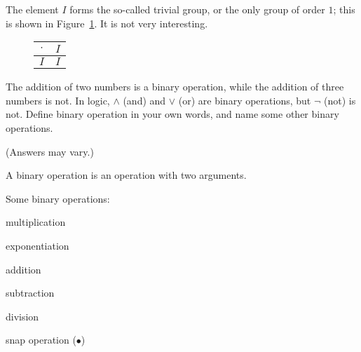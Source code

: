 \documentclass[../key.tex]{subfiles}
\begin{document}
\noindent The element $I$ forms the so-called trivial group, or the only group of order $1$; this is shown in Figure~\ref{fig:trivial_group}. It is not very interesting.

\begin{figure}[h]
	\begin{center}
		\begin{minipage}[b]{\textwidth}
			\centering
			\begin{tabular}{c|c}
				\hline
				$\cdot$ & $I$ \\ \hline
				\rowcolor{light-gray}
				$I$ & $I$ \\ \hline
			\end{tabular}
			\vspace*{0.5\baselineskip}
		\end{minipage}
	\end{center}
	\vspace*{-2\baselineskip}
	\begin{center}
		\begin{minipage}[t]{\textwidth}
			\label{fig:trivial_group}
		\end{minipage}
	\end{center}
	\vspace*{-2\baselineskip}
\end{figure}

\begin{outer_problem}
\item The addition of two numbers is a binary operation, while the addition of three numbers is not. In logic, $\land$ (and) and $\lor$ (or) are binary operations, but $\lnot$ (not) is not. Define binary operation in your own words, and name some other binary operations.
\end{outer_problem}

\noindent (Answers may vary.)

A binary operation is an operation with two arguments.

Some binary operations:
\begin{enumerate}
\begin{multicols}{4}
\item multiplication
\item exponentiation
\item addition
\item subtraction
\item division
\item snap operation ($\bullet$)
\end{multicols}
\end{enumerate}
\end{document}
